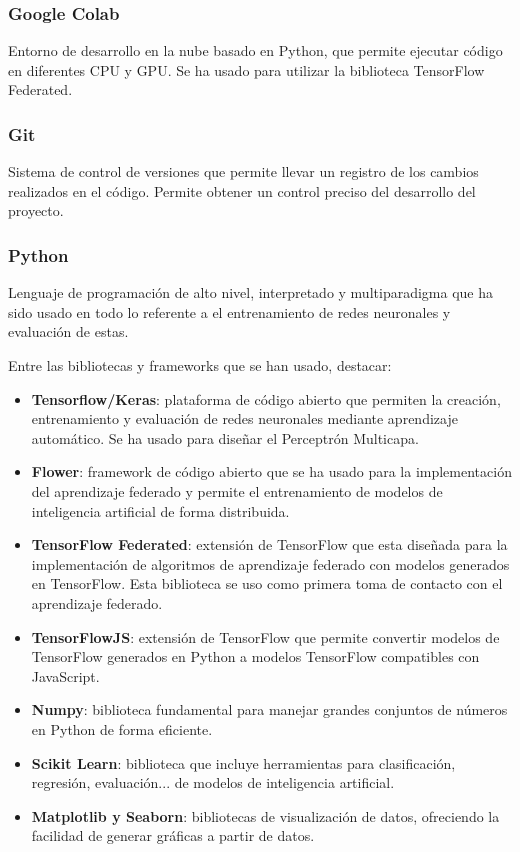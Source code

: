 \subsubsection{Google Colab}
\label{subsubsec:Colab}
Entorno de desarrollo en la nube basado en Python, que permite ejecutar código en diferentes CPU y GPU. Se ha usado para utilizar la biblioteca TensorFlow Federated.

\subsubsection{Git}
\label{subsubsec:Git}
Sistema de control de versiones que permite llevar un registro de los cambios realizados en el código. Permite obtener un control preciso del desarrollo del proyecto. 

\subsubsection{Python}
\label{subsubsec:Python}
Lenguaje de programación de alto nivel, interpretado y multiparadigma que ha sido usado en todo lo referente a el entrenamiento de redes neuronales y evaluación de estas.

Entre las bibliotecas y frameworks que se han usado, destacar:
\begin{itemize}
    \item \textbf{Tensorflow/Keras}: plataforma de código abierto que permiten la creación, entrenamiento y evaluación de redes neuronales mediante aprendizaje automático. Se ha usado para diseñar el Perceptrón Multicapa.
    \item \textbf{Flower}: framework de código abierto que se ha usado para la implementación del aprendizaje federado y permite el entrenamiento de modelos de inteligencia artificial de forma distribuida.
    \item \textbf{TensorFlow Federated}: extensión de TensorFlow que esta diseñada para la implementación de algoritmos de aprendizaje federado con modelos generados en TensorFlow. Esta biblioteca se uso como primera toma de contacto con el aprendizaje federado.
    \item \textbf{TensorFlowJS}: extensión de TensorFlow que permite convertir modelos de TensorFlow generados en Python a modelos TensorFlow compatibles con JavaScript.
    \item \textbf{Numpy}: biblioteca fundamental para manejar grandes conjuntos de números en Python de forma eficiente.
    \item \textbf{Scikit Learn}: biblioteca que incluye herramientas para clasificación, regresión, evaluación... de modelos de inteligencia artificial.
    \item \textbf{Matplotlib y Seaborn}: bibliotecas de visualización de datos, ofreciendo la facilidad de generar gráficas a partir de datos.
\end{itemize}


